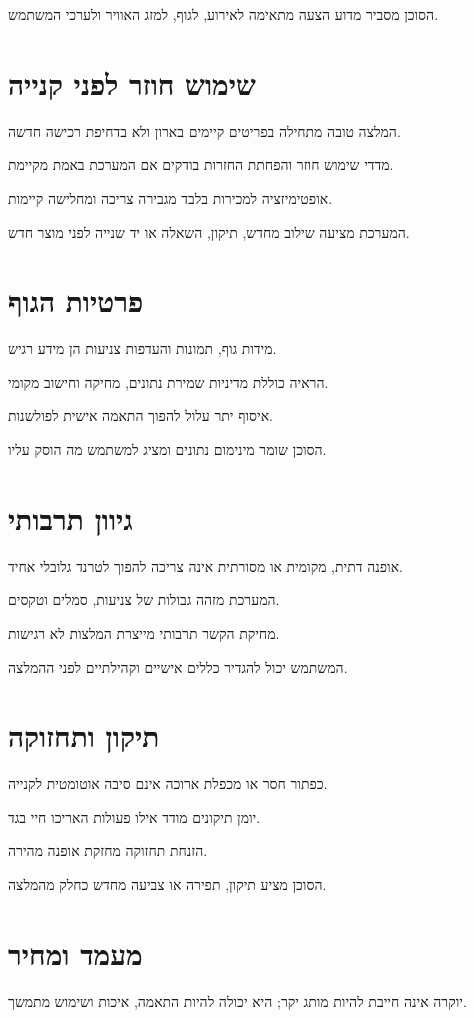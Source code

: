 הסוכן מסביר מדוע הצעה מתאימה לאירוע, לגוף, למזג האוויר ולערכי המשתמש.

\section{שימוש חוזר לפני קנייה}
המלצה טובה מתחילה בפריטים קיימים בארון ולא בדחיפת רכישה חדשה.

מדדי שימוש חוזר והפחתת החזרות בודקים אם המערכת באמת מקיימת.

אופטימיזציה למכירות בלבד מגבירה צריכה ומחלישה קיימות.

המערכת מציעה שילוב מחדש, תיקון, השאלה או יד שנייה לפני מוצר חדש.

\section{פרטיות הגוף}
מידות גוף, תמונות והעדפות צניעות הן מידע רגיש.

הראיה כוללת מדיניות שמירת נתונים, מחיקה וחישוב מקומי.

איסוף יתר עלול להפוך התאמה אישית לפולשנות.

הסוכן שומר מינימום נתונים ומציג למשתמש מה הוסק עליו.

\section{גיוון תרבותי}
אופנה דתית, מקומית או מסורתית אינה צריכה להפוך לטרנד גלובלי אחיד.

המערכת מזהה גבולות של צניעות, סמלים וטקסים.

מחיקת הקשר תרבותי מייצרת המלצות לא רגישות.

המשתמש יכול להגדיר כללים אישיים וקהילתיים לפני ההמלצה.

\section{תיקון ותחזוקה}
כפתור חסר או מכפלת ארוכה אינם סיבה אוטומטית לקנייה.

יומן תיקונים מודד אילו פעולות האריכו חיי בגד.

הזנחת תחזוקה מחזקת אופנה מהירה.

הסוכן מציע תיקון, תפירה או צביעה מחדש כחלק מהמלצה.

\section{מעמד ומחיר}
יוקרה אינה חייבת להיות מותג יקר; היא יכולה להיות התאמה, איכות ושימוש מתמשך.

